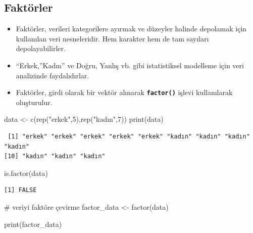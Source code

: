 \documentclass[
  letterpaper,
  DIV=11,
  numbers=noendperiod]{scrreprt}
\newenvironment{Shaded}{\begin{snugshade}}{\end{snugshade}}
\newcommand{\CommentTok}[1]{\textcolor[rgb]{0.37,0.37,0.37}{#1}}
\newcommand{\DecValTok}[1]{\textcolor[rgb]{0.68,0.00,0.00}{#1}}
\newcommand{\FunctionTok}[1]{\textcolor[rgb]{0.28,0.35,0.67}{#1}}
\newcommand{\NormalTok}[1]{\textcolor[rgb]{0.00,0.23,0.31}{#1}}
\newcommand{\OtherTok}[1]{\textcolor[rgb]{0.00,0.23,0.31}{#1}}
\newcommand{\StringTok}[1]{\textcolor[rgb]{0.13,0.47,0.30}{#1}}
\begin{document}
\hypertarget{faktuxf6rler}{%
\subsection{Faktörler}\label{faktuxf6rler}}

\begin{itemize}
\item
  Faktörler, verileri kategorilere ayırmak ve düzeyler halinde depolamak
  için kullanılan veri nesneleridir. Hem karakter hem de tam sayıları
  depolayabilirler.
\item
  ``Erkek,''Kadın'' ve Doğru, Yanlış vb. gibi istatistiksel modelleme
  için veri analizinde faydalıdırlar.
\item
  Faktörler, girdi olarak bir vektör alınarak \textbf{\texttt{factor()}}
  işlevi kullanılarak oluşturulur.
\end{itemize}

\begin{Shaded}
\begin{Highlighting}[]
\NormalTok{data }\OtherTok{\textless{}{-}} \FunctionTok{c}\NormalTok{(}\FunctionTok{rep}\NormalTok{(}\StringTok{"erkek"}\NormalTok{,}\DecValTok{5}\NormalTok{),}\FunctionTok{rep}\NormalTok{(}\StringTok{"kadın"}\NormalTok{,}\DecValTok{7}\NormalTok{))}
\FunctionTok{print}\NormalTok{(data)}
\end{Highlighting}
\end{Shaded}

\begin{verbatim}
 [1] "erkek" "erkek" "erkek" "erkek" "erkek" "kadın" "kadın" "kadın" "kadın"
[10] "kadın" "kadın" "kadın"
\end{verbatim}

\begin{Shaded}
\begin{Highlighting}[]
\FunctionTok{is.factor}\NormalTok{(data)}
\end{Highlighting}
\end{Shaded}

\begin{verbatim}
[1] FALSE
\end{verbatim}

\begin{Shaded}
\begin{Highlighting}[]
\CommentTok{\# veriyi faktöre çevirme}
\NormalTok{factor\_data }\OtherTok{\textless{}{-}} \FunctionTok{factor}\NormalTok{(data)}

\FunctionTok{print}\NormalTok{(factor\_data)}
\end{Highlighting}
\end{Shaded}
\end{document}
